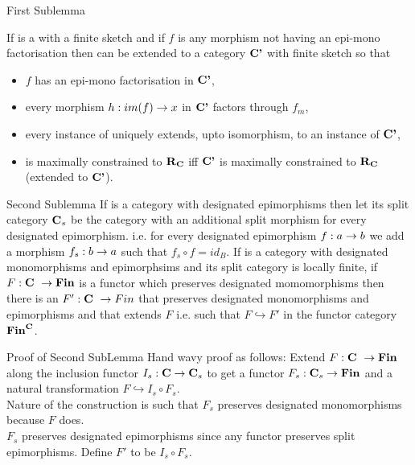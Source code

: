 \begin{frame}{First Sublemma}
\begin{lemma}
If \catcw is a \catMEterm with a finite sketch and if $f$ is any  morphism 
not having an epi-mono factorisation then \catcw can be extended to a category $\textbf{C'}$ with finite sketch so that
\begin{itemize} 
\item $f$ has an epi-mono factorisation \factorisationfdiagram in $\textbf{C'}$,
\item every morphism $h:im(f) \rightarrow x$ in $\textbf{C'}$ factors through $f_m$,
\item every instance of \catcw uniquely extends, upto isomorphism, to an instance of $\textbf{C'}$,
\item \catcw is maximally constrained to $\textbf{R}_{\textbf{C}}$ iff $\textbf{C'}$ is maximally constrained to $\textbf{R}_{\textbf{C}}$ (extended to $\textbf{C'}$).
\end{itemize} 
\end{lemma} 
\end{frame}

\begin{frame}{Second Sublemma}
If \catcw is a category with designated epimorphisms then let its split category 
$\textbf{C}_s$ be the category \catcw with an additional split morphism for every designated epimorphism.
i.e. for every designated epimorphism $f: a \rightarrow b$ we add a morphism $f_s:b \rightarrow a$
such that $f_s \circ f = id_B$.
\medskip
If \catcw is a category with designated monomorphisms and epimorphsims and its split category
is locally finite, if $F: \textbf{C}\  \rightarrow \textbf{Fin}$ is a functor which preserves designated momomorphisms
then there is an $F':\textbf{C}\  \rightarrow Fin$ that preserves designated monomorphisms and epimorphisms
and that extends $F$ i.e. such that $F \hookrightarrow F'$ in the functor category $\textbf{Fin}^{\textbf{C}}$.
\end{frame}

\begin{frame}{Proof of Second SubLemma}
Hand wavy proof as follows:
Extend $F:\textbf{C}\  \rightarrow \textbf{Fin}$ along the inclusion functor $I_s:\textbf{C} \rightarrow \textbf{C}_s$ to get a functor 
$F_s:\textbf{C}_s \rightarrow \textbf{Fin}$ and a natural transformation $F \hookrightarrow I_s \circ F_s$. \\
\medskip
Nature of the construction is such that $F_s$ preserves designated monomorphisms because $F$ does.\\
\medskip
$F_s$ preserves designated epimorphisms since any functor preserves split epimorphisms.
Define $F'$ to be $I_s \circ F_s$.
\end{frame}

